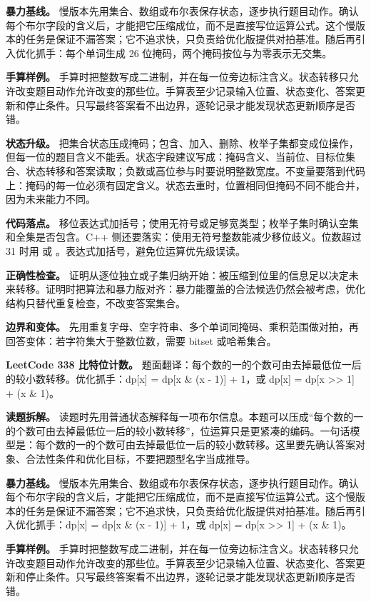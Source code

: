 \textbf{暴力基线。} 慢版本先用集合、数组或布尔表保存状态，逐步执行题目动作。确认每个布尔字段的含义后，才能把它压缩成位，而不是直接写位运算公式。这个慢版本的任务是保证不漏答案；它不追求快，只负责给优化版提供对拍基准。随后再引入优化抓手：每个单词生成 26 位掩码，两个掩码按位与为零表示无交集。

\textbf{手算样例。} 手算时把整数写成二进制，并在每一位旁边标注含义。状态转移只允许改变题目动作允许改变的那些位。手算表至少记录输入位置、状态变化、答案更新和停止条件。只写最终答案看不出边界，逐轮记录才能发现状态更新顺序是否错。

\textbf{状态升级。} 把集合状态压成掩码；包含、加入、删除、枚举子集都变成位操作，但每一位的题目含义不能丢。状态字段建议写成：掩码含义、当前位、目标位集合、状态转移和答案读取；负数或高位参与时要说明整数宽度。不变量要落到代码上：掩码的每一位必须有固定含义。状态去重时，位置相同但掩码不同不能合并，因为未来能力不同。

\textbf{代码落点。} 移位表达式加括号；使用无符号或足够宽类型；枚举子集时确认空集和全集是否包含。C++ 侧还要落实：使用无符号整数能减少移位歧义。位数超过 31 时用  或 。表达式加括号，避免位运算优先级误读。

\textbf{正确性检查。} 证明从逐位独立或子集归纳开始：被压缩到位里的信息足以决定未来转移。证明时把算法和暴力版对齐：暴力能覆盖的合法候选仍然会被考虑，优化结构只替代重复检查，不改变答案集合。

\textbf{边界和变体。} 先用重复字母、空字符串、多个单词同掩码、乘积范围做对拍，再回答变体：若字符集大于整数位数，需要 bitset 或哈希集合。

\noindent\textbf{LeetCode 338 比特位计数。} 题面翻译：每个数的一的个数可由去掉最低位一后的较小数转移。优化抓手：dp[x] = dp[x \& (x - 1)] + 1，或 dp[x] = dp[x >> 1] + (x \& 1)。

\textbf{读题拆解。} 读题时先用普通状态解释每一项布尔信息。本题可以压成“每个数的一的个数可由去掉最低位一后的较小数转移”，位运算只是更紧凑的编码。一句话模型是：每个数的一的个数可由去掉最低位一后的较小数转移。这里要先确认答案对象、合法性条件和优化目标，不要把题型名字当成推导。

\textbf{暴力基线。} 慢版本先用集合、数组或布尔表保存状态，逐步执行题目动作。确认每个布尔字段的含义后，才能把它压缩成位，而不是直接写位运算公式。这个慢版本的任务是保证不漏答案；它不追求快，只负责给优化版提供对拍基准。随后再引入优化抓手：dp[x] = dp[x \& (x - 1)] + 1，或 dp[x] = dp[x >> 1] + (x \& 1)。

\textbf{手算样例。} 手算时把整数写成二进制，并在每一位旁边标注含义。状态转移只允许改变题目动作允许改变的那些位。手算表至少记录输入位置、状态变化、答案更新和停止条件。只写最终答案看不出边界，逐轮记录才能发现状态更新顺序是否错。

